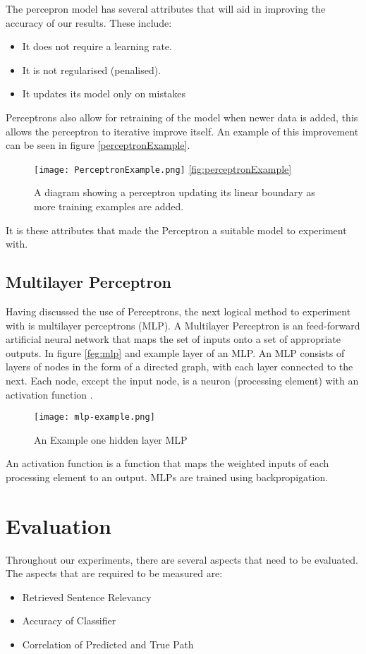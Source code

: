 \documentclass[bsc,frontabs,twoside,singlespacing,parskip,deptreport]{infthesis}     %
\begin{document}
The percepron model has several attributes that will aid in improving the accuracy of our results.
These include:
\begin{itemize}
\item It does not require a learning rate.
\item It is not regularised (penalised).
\item It updates its model only on mistakes
\end{itemize}

Perceptrons also allow for retraining of the model when newer data is added, this allows the perceptron to
iterative improve itself. An example of this improvement can be seen in figure \ref{perceptronExample}.
\begin{figure}[ht]
  \centering
  \texttt{[image: PerceptronExample.png]}
  \ref{fig:perceptronExample}
  \caption{A diagram showing a perceptron updating its linear boundary as more training examples are added. }
\end{figure}


It is these attributes that made the Perceptron a suitable model to experiment with.
\subsection{Multilayer Perceptron}
Having discussed the use of Perceptrons, the next logical method to experiment with is multilayer perceptrons (MLP).
A Multilayer Perceptron is an feed-forward artificial neural network that maps the set of inputs
onto a set of appropriate outputs.
In figure \ref{feg:mlp} and example layer of an MLP.
An MLP consists of layers of  nodes in the form of a directed graph, with each layer connected to the next.
Each node, except the input node, is a neuron (processing element) with an activation function \cite{}.%

\begin{figure}
  \centering
  \texttt{[image: mlp-example.png]}
  \caption{An Example one hidden layer MLP \cite{scikit-learn}}
  \label{fig:mlp}
\end{figure}

An activation function is a function that maps the weighted inputs of each processing element to an output.
MLPs are trained using backpropigation.

\section{Evaluation}
Throughout our experiments, there are several aspects that need to be evaluated.
The aspects that are required to be measured are:
\begin{itemize}
  \item Retrieved Sentence Relevancy
  \item Accuracy of Classifier
  \item Correlation of Predicted and True Path
\end{itemize}
\end{document}
